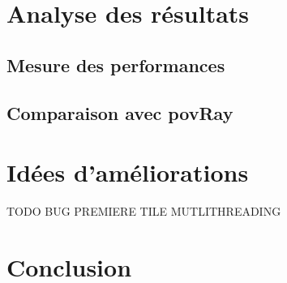 \documentclass[11pt]{article}
\begin{document}
\section{Analyse des résultats}
    \subsection{Mesure des performances}
        

    \subsection{Comparaison avec povRay}
\section{Idées d'améliorations}
TODO BUG PREMIERE TILE MUTLITHREADING
\section{Conclusion}
\end{document}
